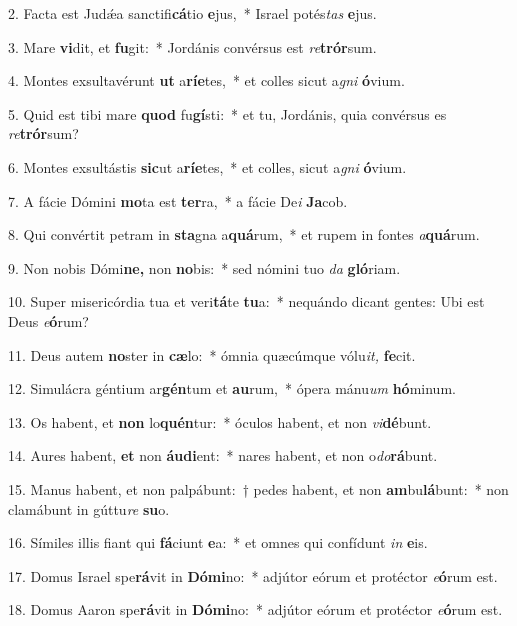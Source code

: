 \item 2. Facta est Judǽa sanctifi\textbf{cá}tio \textbf{e}jus,~* Israel potés\textit{tas} \textbf{e}jus.
\item 3. Mare \textbf{vi}dit, et \textbf{fu}git:~* Jordánis convérsus est \textit{re}\textbf{trór}sum.
\item 4. Montes exsultavérunt \textbf{ut} a\textbf{rí}\textbf{e}tes,~* et colles sicut a\textit{gni} \textbf{ó}vium.
\item 5. Quid est tibi mare \textbf{quod} fu\textbf{gí}sti:~* et tu, Jordánis, quia convérsus es \textit{re}\textbf{trór}sum?
\item 6. Montes exsultástis \textbf{sic}ut a\textbf{rí}\textbf{e}tes,~* et colles, sicut a\textit{gni} \textbf{ó}vium.
\item 7. A fácie Dómini \textbf{mo}ta est \textbf{ter}ra,~* a fácie De\textit{i} \textbf{Ja}cob.
\item 8. Qui convértit petram in \textbf{sta}gna a\textbf{quá}rum,~* et rupem in fontes \textit{a}\textbf{quá}rum.
\item 9. Non nobis Dómi\textbf{ne,} non \textbf{no}bis:~* sed nómini tuo \textit{da} \textbf{gló}riam.
\item 10. Super misericórdia tua et veri\textbf{tá}te \textbf{tu}a:~* nequándo dicant gentes: Ubi est Deus \textit{e}\textbf{ó}rum?
\item 11. Deus autem \textbf{no}ster in \textbf{cæ}lo:~* ómnia quæcúmque vólu\textit{it,} \textbf{fe}cit.
\item 12. Simulácra géntium ar\textbf{gén}tum et \textbf{au}rum,~* ópera mánu\hspace{0.03em}\textit{um} \textbf{hó}minum.
\item 13. Os habent, et \textbf{non} lo\textbf{quén}tur:~* óculos habent, et non \textit{vi}\textbf{dé}bunt.
\item 14. Aures habent, \textbf{et} non \textbf{áu}\textbf{di}ent:~* nares habent, et non o\textit{do}\textbf{rá}bunt.
\item 15. Manus habent, et non palpábunt:~† pedes habent, et non \textbf{am}bu\textbf{lá}bunt:~* non clamábunt in gúttu\textit{re} \textbf{su}o.
\item 16. Símiles illis fiant qui \textbf{fá}ciunt \textbf{e}a:~* et omnes qui confídunt \textit{in} \textbf{e}is.
\item 17. Domus Israel spe\textbf{rá}vit in \textbf{Dó}\textbf{mi}no:~* adjútor eórum et protéctor \textit{e}\textbf{ó}rum est.
\item 18. Domus Aaron spe\textbf{rá}vit in \textbf{Dó}\textbf{mi}no:~* adjútor eórum et protéctor \textit{e}\textbf{ó}rum est.
